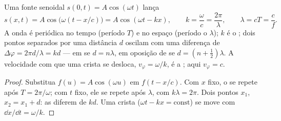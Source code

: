 \begin{proposition}\label{prop:b1:wave-propagation:sinusoidal}
Uma fonte senoidal $s(0, t) = A\cos(\omega t)$ lança
\[
s(x, t) = A\cos\!\big(\omega(t - x/c)\big) = A\cos(\omega t - kx),
\qquad k = \frac{\omega}{c} = \frac{2\pi}{\lambda},
\qquad \lambda = cT = \frac{c}{f}.
\]
A onda é periódica no tempo (período $T$) e no espaço (período o
\emph{} $\lambda$); $k$ é o \emph{}; dois pontos
separados por uma distância $d$ oscilam com uma diferença de 
$\Delta\varphi = 2\pi d/\lambda = kd$ --- em  se $d = n\lambda$, em
oposição de  se $d = (n + \tfrac12)\lambda$. A velocidade com que uma
crista se desloca, $v_\varphi = \omega/k$, é a \emph{};
aqui $v_\varphi = c$.
\end{proposition}

\begin{proof}
Substitua $f(u) = A\cos(\omega u)$ em $f(t - x/c)$. Com $x$ fixo, o
 se repete após $T = 2\pi/\omega$; com $t$ fixo, ele se repete após
$\lambda$, com $k\lambda = 2\pi$. Dois pontos $x_1$, $x_2 = x_1 + d$: as
 diferem de $kd$. Uma crista ($\omega t - kx = \text{const}$) se move com
$\dd x/\dd t = \omega/k$.
\end{proof}

